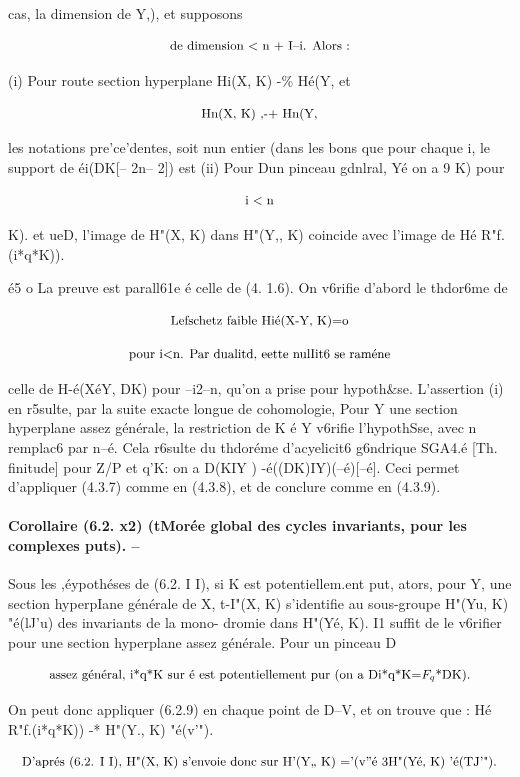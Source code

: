 \documentclass[11pt]{article}
\theoremstyle{remark}
\begin{document}
cas, la dimension de Y,), et supposons

\[\text{\small de dimension < n + I--i. Alors :}\]

(i) Pour route section hyperplane Hi(X, K) -\% Hé(Y, et

\[\text{\small Hn(X, K) ,-+ Hn(Y,}\]

les notations pre'ce'dentes, soit nun entier (dans les bons que pour chaque i, le support de éi(DK[-- 2n-- 2]) est (ii) Pour Dun pinceau gdnlral, Yé on a  9 K) pour

\[\text{\small i < n}\]

K). et ueD, l'image de H"(X, K) dans H"(Y,, K) coincide avec l'image de Hé R"f.(i*q*K)).

é5 o La preuve est parall61e é celle de (4. 1.6). On v6rifie d'abord le thdor6me de

\[\text{\small Lefschetz faible Hié(X-Y, K)=o}\]

\[\text{\small pour i<n. Par dualitd, eette nulIit6 se raméne}\]

celle de H-é(XéY, DK) pour --i2--n, qu'on a prise pour hypoth\&se. L'assertion (i) en r5sulte, par la suite exacte longue de cohomologie, Pour Y une section hyperplane assez générale, la restriction de K é Y v6rifie l'hypothSse, avec n remplac6 par n--é. Cela r6sulte du thdoréme d'acyelicit6 g6ndrique SGA4.é [Th. finitude] pour Z/P et q'K: on a D(KIY ) -é((DK)IY)(--é)[--é]. Ceci permet d'appliquer (4.3.7) comme en (4.3.8), et de conclure comme en (4.3.9).

\paragraph{Corollaire (6.2. x2) (tMorée global des cycles invariants, pour les complexes puts). --}

Sous les ,éypothéses de (6.2. I I), si K est potentiellem.ent put, ators, pour Y, une section hyperpIane générale de X, t-I"(X, K) s'identifie au sous-groupe H"(Yu, K) "é(lJ'u) des invariants de la mono- dromie dans H"(Yé, K). I1 suffit de le v6rifier pour une section hyperplane assez générale. Pour un pinceau D

\[\text{\small assez général, i*q*K sur é est potentiellement pur (on a Di*q*K=\(F_q\)*DK).}\]

On peut donc appliquer (6.2.9) en chaque point de D--V, et on trouve que : Hé R"f.(i*q*K)) -* H"(Y., K) "é(v'").

\[\text{\small D'aprés (6.2. I I), H"(X, K) s'envoie donc sur H'(Y,, K) ='(v''é 3H"(Yé, K) 'é(TJ'").}\]
\end{document}

